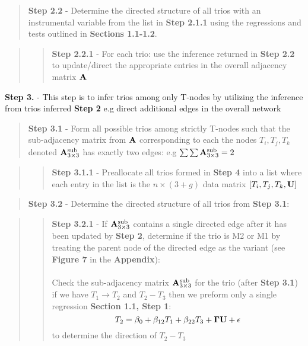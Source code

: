 \documentclass[12pt]{report}
\begin{document}
\begin{quote}
\noindent \textbf{Step 2.2} - Determine the directed structure of all trios with an instrumental variable from the list in \textbf{Step 2.1.1} using the regressions and tests outlined in \textbf{Sections 1.1-1.2}. \\
\end{quote}

\begin{quote}
\begin{quote}
\textbf{Step 2.2.1} - For each trio: use the inference returned in \textbf{Step 2.2} to update/direct the appropriate entries in the overall adjacency matrix $\bf A$ 
\end{quote}
\end{quote}

\noindent \textbf{Step 3.} - This step is to infer trios among only T-nodes by utilizing the inference from trios inferred \textbf{Step 2} e.g direct additional edges in the overall network

\begin{quote}
\textbf{Step 3.1} - Form all possible trios among strictly T-nodes such that the sub-adjacency matrix from $\bf A$ corresponding to each the nodes $T_i, T_j, T_k$ denoted ${\bf A}_{3\times3}^{\text{sub}}$ has exactly two edges: e.g $\sum \sum {\bf A}_{3\times3}^{\text{sub}} = 2$ 
\end{quote}

\begin{quote}
\begin{quote}
\noindent \textbf{Step 3.1.1} -  Preallocate all trios formed in \textbf{Step 4} into a list where each entry in the list is the $n\times(3 +g)$ data matrix $[T_i,T_j,T_k, \bf{U}]$
\end{quote}
\end{quote}

\begin{quote}
\noindent \textbf{Step 3.2} - Determine the directed structure of all trios from \textbf{Step 3.1}:
\end{quote}

\begin{quote}
\begin{quote}
\noindent \textbf{Step 3.2.1} - If ${\bf A}_{3\times3}^{\text{sub}}$ contains a single directed edge after it has been updated by \textbf{Step 2}, determine if the trio is M2 or M1 by treating the parent node of the directed edge as the variant (see \textbf{Figure 7} in the \textbf{Appendix}): \\
\\
Check the sub-adjacency matrix ${\bf A}_{3\times3}^{\text{sub}}$ for the trio (after \textbf{Step 3.1}) if we have $T_1 \rightarrow T_2$ and $T_2 - T_3$ then we preform only a single regression \textbf{Section 1.1, Step 1}:
\[ T_2 = \beta_0 + \beta_{12}T_1 + \beta_{22} T_3 + {\bf \Gamma U} + \epsilon \] 
to determine the direction of $T_2 - T_3$
\end{quote}
\end{quote}
\end{document}
